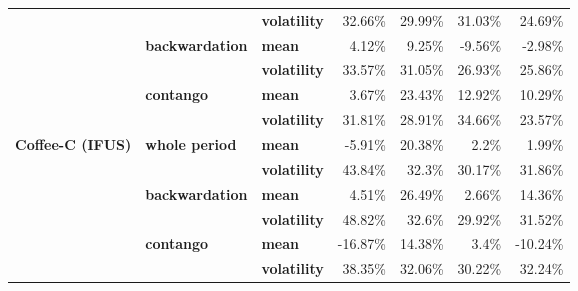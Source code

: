 \documentclass[
  authoryear,
  preprint,
  3p]{elsarticle}
\begin{document}
\begin{longtable}[t]{>{}l>{}l>{}l>{}r>{}r>{}r>{}r}
\addlinespace
\textbf{} & \textbf{} & \textbf{volatility} & \textcolor[HTML]{4285f4}{32.66\%} & \textcolor[HTML]{4285f4}{29.99\%} & \textcolor[HTML]{4285f4}{31.03\%} & \textcolor[HTML]{4285f4}{24.69\%}\\
\textbf{} & \textbf{backwardation} & \textbf{mean} & \textcolor[HTML]{4285f4}{4.12\%} & \textcolor[HTML]{4285f4}{9.25\%} & \textcolor[HTML]{4285f4}{-9.56\%} & \textcolor[HTML]{4285f4}{-2.98\%}\\
\textbf{} & \textbf{} & \textbf{volatility} & \textcolor[HTML]{4285f4}{33.57\%} & \textcolor[HTML]{4285f4}{31.05\%} & \textcolor[HTML]{4285f4}{26.93\%} & \textcolor[HTML]{4285f4}{25.86\%}\\
\textbf{} & \textbf{contango} & \textbf{mean} & \textcolor[HTML]{4285f4}{3.67\%} & \textcolor[HTML]{4285f4}{23.43\%} & \textcolor[HTML]{4285f4}{12.92\%} & \textcolor[HTML]{4285f4}{10.29\%}\\
\textbf{} & \textbf{} & \textbf{volatility} & \textcolor[HTML]{4285f4}{31.81\%} & \textcolor[HTML]{4285f4}{28.91\%} & \textcolor[HTML]{4285f4}{34.66\%} & \textcolor[HTML]{4285f4}{23.57\%}\\
\addlinespace
\textbf{Coffee-C (IFUS)} & \textbf{whole period} & \textbf{mean} & \textcolor[HTML]{4285f4}{-5.91\%} & \textcolor[HTML]{4285f4}{20.38\%} & \textcolor[HTML]{4285f4}{2.2\%} & \textcolor[HTML]{4285f4}{1.99\%}\\
\textbf{} & \textbf{} & \textbf{volatility} & \textcolor[HTML]{4285f4}{43.84\%} & \textcolor[HTML]{4285f4}{32.3\%} & \textcolor[HTML]{4285f4}{30.17\%} & \textcolor[HTML]{4285f4}{31.86\%}\\
\textbf{} & \textbf{backwardation} & \textbf{mean} & \textcolor[HTML]{4285f4}{4.51\%} & \textcolor[HTML]{4285f4}{26.49\%} & \textcolor[HTML]{4285f4}{2.66\%} & \textcolor[HTML]{4285f4}{14.36\%}\\
\textbf{} & \textbf{} & \textbf{volatility} & \textcolor[HTML]{4285f4}{48.82\%} & \textcolor[HTML]{4285f4}{32.6\%} & \textcolor[HTML]{4285f4}{29.92\%} & \textcolor[HTML]{4285f4}{31.52\%}\\
\textbf{} & \textbf{contango} & \textbf{mean} & \textcolor[HTML]{4285f4}{-16.87\%} & \textcolor[HTML]{4285f4}{14.38\%} & \textcolor[HTML]{4285f4}{3.4\%} & \textcolor[HTML]{4285f4}{-10.24\%}\\
\addlinespace
\textbf{} & \textbf{} & \textbf{volatility} & \textcolor[HTML]{4285f4}{38.35\%} & \textcolor[HTML]{4285f4}{32.06\%} & \textcolor[HTML]{4285f4}{30.22\%} & \textcolor[HTML]{4285f4}{32.24\%}\\

\end{longtable}
\end{document}
